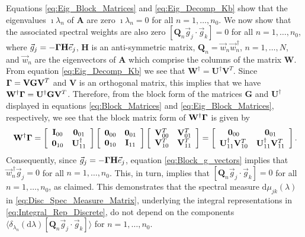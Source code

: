 \documentclass[11pt]{amsart}
\renewcommand{\d}{\mathrm{d}}
\newcommand{\Hb}{\mathbf{H}}
\newcommand{\Ib}{\mathbf{I}}
\newcommand{\Ab}{\mathbf{A}}
\newcommand{\Qb}{\mathbf{Q}}
\newcommand{\Ob}{\mathbf{0}}
\newcommand{\Vb}{\mathbf{V}}
\newcommand{\Wb}{\mathbf{W}}
\newcommand{\Gb}{\mathbf{G}}
\newcommand{\Ub}{\mathbf{U}}
\newcommand\bGamma{\mbox{\boldmath${\Gamma}$}}
\begin{document}
Equations \eqref{eq:Eig_Block_Matrices} and \eqref{eq:Eig_Decomp_Kb}
show that the eigenvalues $\imath\lambda_n$ of $\Ab$ are zero $\imath\lambda_n=0$ for all
$n=1,\ldots,n_0$. We now show that the associated spectral weights are also
zero $[\Qb_n\vec{g}_j\cdot\vec{g}_k]=0$ for all $n=1,\ldots,n_0$, where
$\vec{g}_j=-\bGamma\Hb\vec{e}_j$, $\Hb$ is an anti-symmetric matrix,
$\Qb_n=\vec{w}_n\vec{w}_n^{\,\dagger}$, $n=1,\ldots,N$, and $\vec{w}_n$ are the
eigenvectors of $\Ab$ which comprise the columns of the matrix
$\Wb$. From equation \eqref{eq:Eig_Decomp_Kb} we see that
$\Wb^\dagger=\Ub^\dagger\Vb^T$. Since $\bGamma=\Vb\Gb\Vb^T$ and $\Vb$ is an
orthogonal matrix, this implies that we have
$\Wb^\dagger\bGamma=\Ub^\dagger\Gb\Vb^T$. Therefore, from the block form of the
matrices $\Gb$ and $\Ub^\dagger$ displayed in equations
\eqref{eq:Block_Matrices} and \eqref{eq:Eig_Block_Matrices},
respectively, we see that the block matrix form of $\Wb^\dagger\bGamma$ is
given by    
%
\begin{align}\label{eq:Block_g_vectors}
%
\Wb^\dagger\bGamma
%
=\left[
  \begin{array}{ccc}
    \Ib_{00}&\Ob_{01}\\
    \Ob_{10}&\Ub_{11}^\dagger  
    \end{array}
\right]
\left[
  \begin{array}{ccc}
    \Ob_{00}&\Ob_{01}\\
    \Ob_{10}&\Ib_{11}   
    \end{array}
\right]
\left[
  \begin{array}{ccc}
    \Vb_{00}^T&\Vb_{01}^T\\
    \Vb_{10}^T&\Vb_{11}^T   
    \end{array}
\right]
=
\left[
  \begin{array}{ccc}
    \Ob_{00}&\Ob_{01}\\
    \Ub_{11}^\dagger\Vb_{10}^T &\Ub_{11}^\dagger\Vb_{11}^T   
    \end{array}
\right].
\end{align}
%
Consequently, since $\vec{g}_j=-\bGamma\Hb\vec{e}_j$, equation
\eqref{eq:Block_g_vectors} implies that $\vec{w}_n^{\,\dagger}\vec{g}_j=0$
for all $n=1,\ldots,n_0$. This, in turn, implies that
$[\Qb_n\vec{g}_j\cdot\vec{g}_k]=0$ for all $n=1,\ldots,n_0$, as claimed.  This
demonstrates that the spectral measure $\d\mu_{jk}(\lambda)$ in
\eqref{eq:Disc_Spec_Measure_Matrix}, underlying the integral representations
in \eqref{eq:Integral_Rep_Discrete}, do not depend on the components
$\langle\delta_{\lambda_n}(\d\lambda)[\Qb_n\vec{g}_j\cdot\vec{g}_k]\rangle$ for $n=1,\ldots,n_0$.
\end{document}
